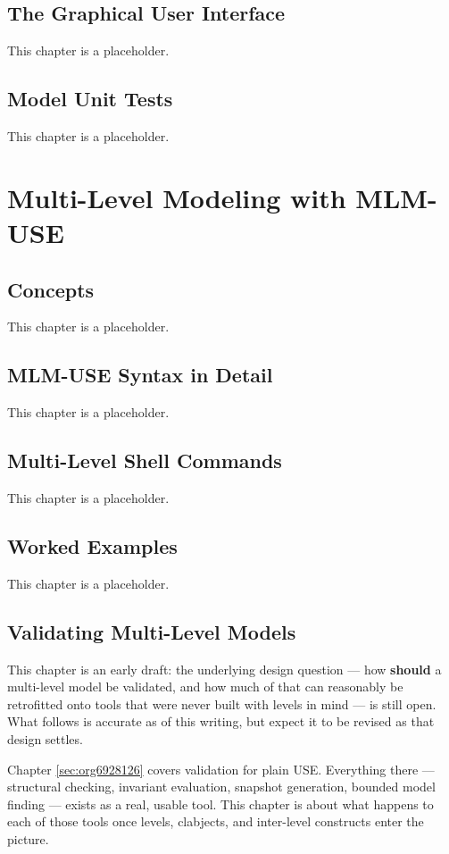 \documentclass[11pt,twoside,a4paper]{book}
\begin{document}
\chapter{The Graphical User Interface}
\label{sec:org1b0f916}
This chapter is a placeholder.
\chapter{Model Unit Tests}
\label{sec:org4f8ed77}
This chapter is a placeholder.
\part{Multi-Level Modeling with MLM-USE}
\label{sec:org6a6c176}
\chapter{Concepts}
\label{sec:orgde23e19}
This chapter is a placeholder.
\chapter{MLM-USE Syntax in Detail}
\label{sec:orgec4571f}
This chapter is a placeholder.
\chapter{Multi-Level Shell Commands}
\label{sec:org38c2e81}
This chapter is a placeholder.
\chapter{Worked Examples}
\label{sec:org2f12cb5}
This chapter is a placeholder.
\chapter{Validating Multi-Level Models}
\label{sec:org3fbf6cb}

This chapter is an early draft: the underlying design question --- how
\textbf{should} a multi-level model be validated, and how much of that can
reasonably be retrofitted onto tools that were never built with levels
in mind --- is still open. What follows is accurate as of this
writing, but expect it to be revised as that design settles.

Chapter \ref{sec:org6928126} covers validation for plain
USE. Everything there --- structural checking, invariant evaluation,
snapshot generation, bounded model finding --- exists as a real,
usable tool. This chapter is about what happens to each of those tools
once levels, clabjects, and inter-level constructs enter the picture.
\end{document}
